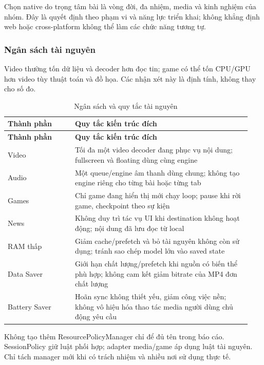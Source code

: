 Chọn native do trọng tâm bài là vòng đời, đa nhiệm, media và kinh nghiệm của nhóm. Đây là quyết định theo phạm vi và năng lực triển khai; không khẳng định web hoặc cross-platform không thể làm các chức năng tương tự.

\subsubsection{Ngân sách tài nguyên}
\label{sec:resource-consumption}

Video thường tốn dữ liệu và decoder hơn đọc tin; game có thể tốn CPU/GPU hơn video tùy thuật toán và đồ họa. Các nhận xét này là định tính, không thay cho số đo.

\begingroup
\small
\renewcommand{\arraystretch}{1.2}
\setlength{\tabcolsep}{3pt}
\begin{longtable}{>{\RaggedRight\arraybackslash}p{0.26\linewidth}>{\RaggedRight\arraybackslash}p{0.68\linewidth}}
\caption{Ngân sách và quy tắc tài nguyên}
\label{tab:resource-policy}\\
\toprule
\textbf{Thành phần} & \textbf{Quy tắc kiến trúc đích} \\
\midrule
\endfirsthead
\toprule
\textbf{Thành phần} & \textbf{Quy tắc kiến trúc đích} \\
\midrule
\endhead
\bottomrule
\endfoot
Video & Tối đa một video decoder đang phục vụ nội dung; fullscreen và floating dùng cùng engine \\
Audio & Một queue/engine âm thanh dùng chung; không tạo engine riêng cho từng bài hoặc từng tab \\
Games & Chỉ game đang hiển thị mới chạy loop; pause khi rời game, checkpoint theo sự kiện \\
News & Không duy trì tác vụ UI khi destination không hoạt động; nội dung đã lưu đọc từ local \\
RAM thấp & Giảm cache/prefetch và bỏ tài nguyên không còn sử dụng; tránh sao chép model lớn vào saved state \\
Data Saver & Giới hạn chất lượng/prefetch khi nguồn có biến thể phù hợp; không cam kết giảm bitrate của MP4 đơn chất lượng \\
Battery Saver & Hoãn sync không thiết yếu, giảm công việc nền; không vô hiệu hóa thao tác media người dùng chủ động yêu cầu \\
\end{longtable}
\endgroup

Không tạo thêm ResourcePolicyManager chỉ để đủ tên trong báo cáo. SessionPolicy giữ luật phối hợp; adapter media/game áp dụng luật tài nguyên. Chỉ tách manager mới khi có trách nhiệm và nhiều nơi sử dụng thực tế.

